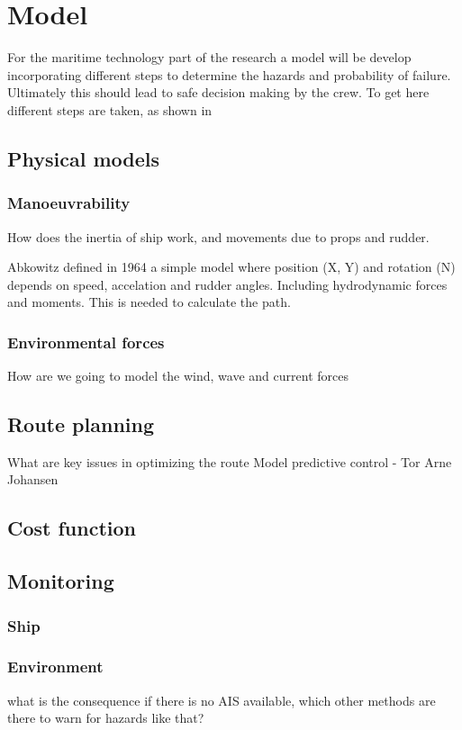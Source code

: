 \chapter{Model}
For the maritime technology part of the research a model will be develop incorporating different steps to determine the hazards and probability of failure. Ultimately this should lead to safe decision making by the crew. To get here different steps are taken, as shown in 





\section{Physical models}

\subsection{Manoeuvrability}
How does the inertia of ship work, and movements due to props and rudder.

Abkowitz defined in 1964 a simple model where position (X, Y) and rotation (N) depends on speed, accelation and rudder angles. Including hydrodynamic forces and moments. This is needed to calculate the path. 

\subsection{Environmental forces}
How are we going to model the wind, wave and current forces

\section{Route planning}
What are key issues in optimizing the route
Model predictive control - Tor Arne Johansen

\section{Cost function}

\section{Monitoring}
\subsection{Ship}

\subsection{Environment}
what is the consequence if there is no AIS available, which other methods are there to warn for hazards like that?

